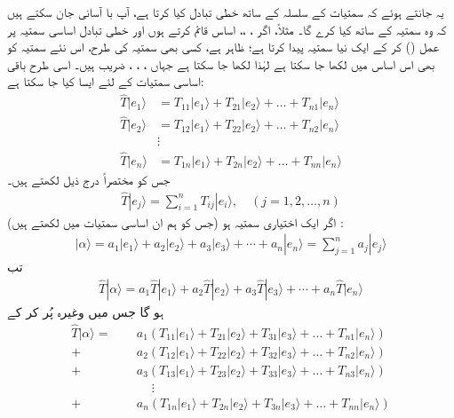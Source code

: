 یہ جانتے ہوئے کہ   سمتیات کے سلسلہ کے ساتھ خطی تبادل کیا کرتا ہے،  آپ با آسانی جان   سکتے ہیں کہ وہ   سمتیہ کے ساتھ کیا کرے گا۔ مثلاً،   اگر  ، ،،  اساس قائم کرتے ہوں  اور خطی تبادل  اساسی سمتیہ  پر عمل () کر کے  ایک  نیا سمتیہ  پیدا کرتا ہے؛ ظاہر ہے، کسی بھی سمتیہ کی طرح،  اس نئے سمتیہ کو بھی اس اساس میں لکھا جا سکتا ہے لہٰذا 
 لکھا جا سکتا ہے جہاں ، ، ،   ضریب  ہیں۔ اسی طرح باقی اساسی سمتیات کے لئے ایسا کیا جا سکتا ہے:
\begin{align*}
	\hat{T}|e_1\rangle &= T_{11}|e_1\rangle+T_{21}|e_2\rangle+\dots+T_{n1}|e_n\rangle\\
	\hat{T}|e_2\rangle &= T_{12}|e_1\rangle+T_{22}|e_2\rangle+\dots+T_{n2}|e_n\rangle\\
	&\vdots\\
	\hat{T}|e_n\rangle &= T_{1n}|e_1\rangle+T_{2n}|e_2\rangle+\dots+T_{nn}|e_n\rangle
\end{align*}
جس کو مختصراً درج ذیل لکھتے ہیں۔
\begin{align}\label{مساوات_ضمیمہ_خطی_تبادلہ}
	\hat{T}|e_{j}\rangle=\sum_{i=1}^{n}T_{ij}|e_i\rangle,\quad(j=1, 2, \dots, n)
\end{align}
اگر  ایک اختیاری سمتیہ ہو  (جس کو  ہم ان اساسی سمتیات میں لکھتے ہیں) :
\begin{align}\label{مساوات_ضمیمہ_اختیاری_سمتیہ}
	|\alpha\rangle=a_1|e_1\rangle+a_2|e_2\rangle+a_3|e_3\rangle+\cdots+a_n|e_n\rangle=\sum_{j=1}^{n}a_j|e_j\rangle
\end{align}
  تب
\begin{align*}
\hat{T}|\alpha\rangle= a_1\hat{T}|e_1\rangle+ a_2\hat{T}|e_2\rangle+ a_3\hat{T}|e_3\rangle+\cdots+ a_n\hat{T}|e_n\rangle
\end{align*}
ہو گا  جس میں  وغیرہ پُر کر کے
\begin{align*}
\hat{T}|\alpha\rangle=\phantom{+}& a_1(T_{11}|e_1\rangle+T_{21}|e_2\rangle+T_{31}|e_3\rangle+\dots+T_{n1}|e_n\rangle)\\
+&a_2(T_{12}|e_1\rangle+T_{22}|e_2\rangle+T_{32}|e_3\rangle+\dots+T_{n2}|e_n\rangle)\\
+&a_3(T_{13}|e_1\rangle+T_{23}|e_2\rangle+T_{33}|e_3\rangle+\dots+T_{n3}|e_n\rangle)\\
&\phantom{+}\vdots\\
+&a_n(T_{1n}|e_1\rangle+T_{2n}|e_2\rangle+T_{3n}|e_3\rangle+\dots+T_{nn}|e_n\rangle)
\end{align*}
